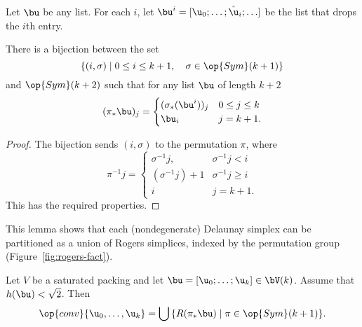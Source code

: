 \begin{definition}
Let $\bu$ be any list.
For each $i$,  let
$\bu^i = [\u_0;\ldots;\hat\u_i;\ldots]$ be the list that drops the $i$th entry.
\end{definition}

\begin{lemma}
\label{lemma:coset-bijection} 
There is a bijection between the set 
\[  
\{(i,\sigma)\mid 0\le i\le k+1,\quad \sigma\in \op{Sym}(k+1)\}
\] 
and $\op{Sym}(k+2)$ such that for any list $\bu$ of length $k+2$
\[
(\pi_*\bu)_j = \begin{cases} (\sigma_*(\bu^i))_j&0\le j \le k\\
  \bu_i & j=k+1.
\end{cases}
\]
\end{lemma}

\begin{proof} 
The bijection sends $(i,\sigma)$ to the permutation $\pi$, where
\[  
\pi^{-1} j = \begin{cases} 
\sigma^{-1} j, & \sigma^{-1} j<i\\
(\sigma^{-1}j)+1 & \sigma^{-1} j \ge i\\
i& j=k+1.
\end{cases}
\] 
This has the required properties.
\end{proof}

This lemma shows that each (nondegenerate) Delaunay simplex can be
partitioned as a union of Rogers simplices, indexed by the permutation
group (Figure~\ref{fig:rogers-fact}).

\figYAJOTSL %

\begin{lemma}\label{lemma:Rconv}  
  Let $V$ be a saturated packing and let $\bu = [\u_0;\ldots;\u_k]\in
  \bV(k)$.  Assume that $h(\bu)<\sqrt2$.  
  Then
\[  
\op{conv}\{ \u_0,\ldots, \u_k\} = \bigcup \,\{ R(\pi_*\bu) \mid \pi\in \op{Sym}(k+1)\}.
\] 
\end{lemma}
%

